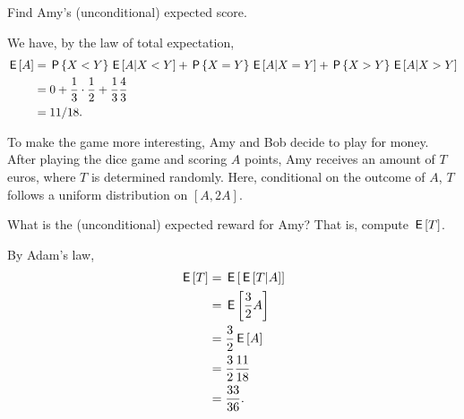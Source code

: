 \begin{exercise}[1.5]
Find Amy's (unconditional) expected score.
\begin{solution}
We have, by the law of total expectation,
\begin{align}
    \,\mathsf{E}\left[A\right] &= \,\mathsf{P}\left\{X<Y\right\}\,\mathsf{E}\left[A|X<Y\right] + \,\mathsf{P}\left\{X=Y\right\}\,\mathsf{E}\left[A|X=Y\right] + \,\mathsf{P}\left\{X>Y\right\}\,\mathsf{E}\left[A|X>Y\right] \\
    &= 0 + \frac{1}{3} \cdot \frac{1}{2} + \frac{1}{3} \frac{4}{3} \\
    &= 11/18.
\end{align}
\end{solution}
\end{exercise}

To make the game more interesting, Amy and Bob decide to play for money. After playing the dice game and scoring $A$ points, Amy receives an amount of $T$ euros, where $T$ is determined randomly. Here, conditional on the outcome of $A$, $T$ follows a uniform distribution on $[A,2A]$.
\begin{exercise}[1]
What is the (unconditional) expected reward for Amy? That is, compute $\,\mathsf{E}\left[T\right]$.
\begin{solution}
By Adam's law,
\begin{align}
    \,\mathsf{E}\left[T\right] &= \,\mathsf{E}\left[\,\mathsf{E}\left[T|A\right]\right] \\
    &= \,\mathsf{E}\left[\frac{3}{2}A\right] \\
    &= \frac{3}{2}\,\mathsf{E}\left[A\right] \\
    &= \frac{3}{2} \frac{11}{18} \\
    &= \frac{33}{36}.
\end{align}
\end{solution}
\end{exercise}